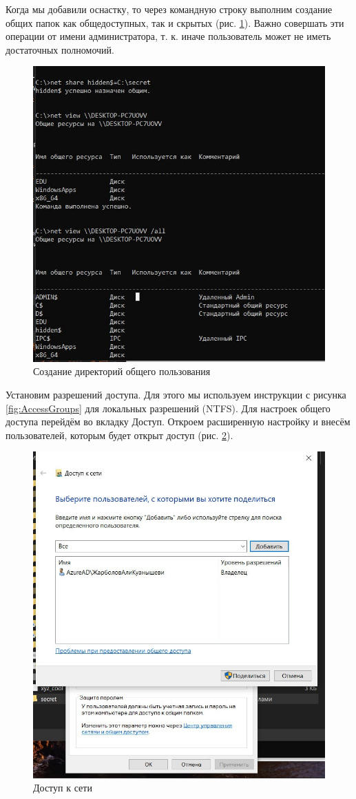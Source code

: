 Когда мы добавили оснастку, то через командную строку выполним создание общих папок как общедоступных, так и скрытых (рис. \ref{fig:HiddenShare}). Важно совершать эти операции от имени администратора, т. к. иначе пользователь может не иметь достаточных полномочий.

\begin{figure}
    \centering
    \includegraphics[width=0.5\linewidth]{Pic/lab2/photo_2025-05-22_00-26-00.jpg}
    \caption{Создание директорий общего пользования}
    \label{fig:HiddenShare}
\end{figure}

Установим разрешений доступа. Для этого мы используем инструкции с рисунка \ref{fig:AccessGroups} для локальных разрешений (NTFS). Для настроек общего доступа перейдём во вкладку Доступ. Откроем расширенную настройку и внесём пользователей, которым будет открыт доступ (рис. \ref{fig:NetAccess}).

\begin{figure}[h!]
    \centering
    \includegraphics[width=0.5\linewidth]{Pic/lab2/photo_2025-05-22_00-26-01.jpg}
    \caption{Доступ к сети}
    \label{fig:NetAccess}
\end{figure}

